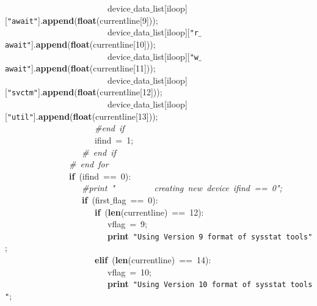 \mbox{}\ \ \ \ \ \ \ \ \ \ \ \ \ \ \ \ \ \ \ \ \ \ \ \ device$\_$data$\_$list[iloop][\texttt{"{}await"{}}].\textbf{append}(\textbf{float}(currentline[9])); \\
\mbox{}\ \ \ \ \ \ \ \ \ \ \ \ \ \ \ \ \ \ \ \ \ \ \ \ device$\_$data$\_$list[iloop][\texttt{"{}r$\_$await"{}}].\textbf{append}(\textbf{float}(currentline[10])); \\
\mbox{}\ \ \ \ \ \ \ \ \ \ \ \ \ \ \ \ \ \ \ \ \ \ \ \ device$\_$data$\_$list[iloop][\texttt{"{}w$\_$await"{}}].\textbf{append}(\textbf{float}(currentline[11])); \\
\mbox{}\ \ \ \ \ \ \ \ \ \ \ \ \ \ \ \ \ \ \ \ \ \ \ \ device$\_$data$\_$list[iloop][\texttt{"{}svctm"{}}].\textbf{append}(\textbf{float}(currentline[12])); \\
\mbox{}\ \ \ \ \ \ \ \ \ \ \ \ \ \ \ \ \ \ \ \ \ \ \ \ device$\_$data$\_$list[iloop][\texttt{"{}util"{}}].\textbf{append}(\textbf{float}(currentline[13])); \\
\mbox{}\ \ \ \ \ \ \ \ \ \ \ \ \ \ \ \ \ \ \ \ \ \textit{\#end\ if\ \ \ \ \ \ \ \ \ \ \ } \\
\mbox{}\ \ \ \ \ \ \ \ \ \ \ \ \ \ \ \ \ \ \ \ \ ifind\ =\ 1; \\
\mbox{}\ \ \ \ \ \ \ \ \ \ \ \ \ \ \ \ \ \ \textit{\#\ end\ if} \\
\mbox{}\ \ \ \ \ \ \ \ \ \ \ \ \ \ \ \textit{\#\ end\ for} \\
\mbox{}\ \ \ \ \ \ \ \ \ \ \ \ \ \ \ \textbf{if}\ (ifind\ ==\ 0): \\
\mbox{}\ \ \ \ \ \ \ \ \ \ \ \ \ \ \ \ \ \ \textit{\#print\ "{}\ \ \ \ \ \ \ \ \ creating\ new\ device\ ifind\ ==\ 0"{};} \\
\mbox{}\ \ \ \ \ \ \ \ \ \ \ \ \ \ \ \ \ \ \textbf{if}\ (first$\_$flag\ ==\ 0): \\
\mbox{}\ \ \ \ \ \ \ \ \ \ \ \ \ \ \ \ \ \ \ \ \ \textbf{if}\ (\textbf{len}(currentline)\ ==\ 12): \\
\mbox{}\ \ \ \ \ \ \ \ \ \ \ \ \ \ \ \ \ \ \ \ \ \ \ \ vflag\ =\ 9; \\
\mbox{}\ \ \ \ \ \ \ \ \ \ \ \ \ \ \ \ \ \ \ \ \ \ \ \ \textbf{print}\ \texttt{"{}Using\ Version\ 9\ format\ of\ sysstat\ tools"{}}; \\
\mbox{}\ \ \ \ \ \ \ \ \ \ \ \ \ \ \ \ \ \ \ \ \ \textbf{elif}\ (\textbf{len}(currentline)\ ==\ 14): \\
\mbox{}\ \ \ \ \ \ \ \ \ \ \ \ \ \ \ \ \ \ \ \ \ \ \ \ vflag\ =\ 10; \\
\mbox{}\ \ \ \ \ \ \ \ \ \ \ \ \ \ \ \ \ \ \ \ \ \ \ \ \textbf{print}\ \texttt{"{}Using\ Version\ 10\ format\ of\ sysstat\ tools"{}}; \\
